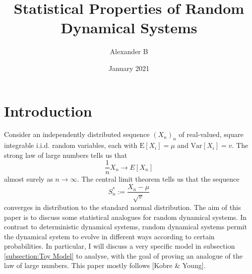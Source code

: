 \documentclass[pdftex,11pt,a4paper,oneside]{article}
\title{Statistical Properties of Random Dynamical Systems}
\author{Alexander B}
\date{January 2021}
\theoremstyle{plain}
\newtheorem{definition}{Definition}[section]
\begin{document}
\maketitle

\section{Introduction}
Consider an independently distributed sequence $(X_n)_n$ of real-valued, square integrable i.i.d. random variables, each with $\mathrm{E}[X_i] = \mu$ and $\mathrm{Var}[X_i] = v$. The strong law of large numbers tells us that 
\[\frac{1}{n}X_n\to E[X_n]\]
almost surely as $n\to\infty$. The central limit theorem tells us that the sequence
\[S_n^*:= \frac{X_n-\mu}{\sqrt{v}}\]
converges in distribution to the standard normal distribution. The aim of this paper is to discuss some statistical analogues for random dynamical systems. In contrast to deterministic dynamical systems, random dynamical systems permit the dynamical system to evolve in different ways according to certain probabilities. In particular, I will discuss a very specific model in subsection \ref{subsection:Toy Model} to analyse, with the goal of proving an analogue of the law of large numbers. This paper mostly follows [Kobre \& Young].


\end{document}
